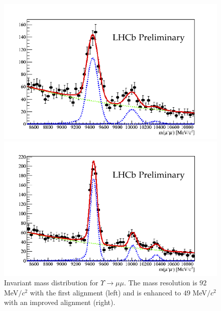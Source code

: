 \begin{figure}[h]
\begin{minipage}{0.5\columnwidth}
\includegraphics[width=\columnwidth]{../figures/Upsilon1}
\end{minipage}\hspace{2pc
}%
\begin{minipage}{0.5\columnwidth}
\includegraphics[width=\columnwidth]{../figures/Upsilon2}
\end{minipage} 
\caption{\label{fig:Upsilon} Invariant mass distribution for $\Upsilon \to \mu
  \mu$. The mass resolution is $92$
  MeV$/c^2$ with the first alignment (left) and is enhanced to $49$
  MeV$/c^2$ with an improved alignment (right).}
\end{figure}

